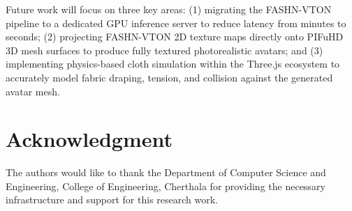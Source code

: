 \documentclass[conference]{IEEEtran}
\begin{document}
Future work will focus on three key areas: (1) migrating the FASHN-VTON pipeline to a dedicated GPU inference server to reduce latency from minutes to seconds; (2) projecting FASHN-VTON 2D texture maps directly onto PIFuHD 3D mesh surfaces \cite{b19} to produce fully textured photorealistic avatars; and (3) implementing physics-based cloth simulation within the Three.js ecosystem \cite{b20} to accurately model fabric draping, tension, and collision against the generated avatar mesh.

\section*{Acknowledgment}
The authors would like to thank the Department of Computer Science and Engineering, College of Engineering, Cherthala for providing the necessary infrastructure and support for this research work.
\end{document}
